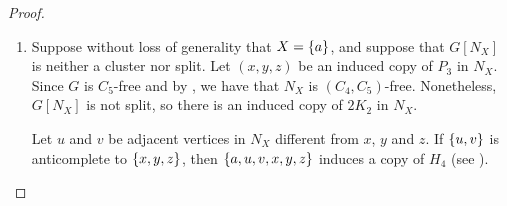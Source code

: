 \begin{proof}
\begin{enumerate}[label=(\roman*)]
\begin{figure}[htb!]
                \caption{An induced copy of $C_5$ or $P_5$ given that $N_X$ and
                    $N_Y$ are nonempty.}
                \label{fig:type_6}
            \end{figure}

        \item Suppose without loss of generality that $X=\left\{a\right\}$, and suppose
            that $G[N_X]$ is neither a cluster nor split. Let $(x,y,z)$ be an
            induced copy of $P_3$ in $N_X$. Since $G$ is $C_5$-free and by
            , we have that $N_X$ is $(C_4,C_5)$-free.
            Nonetheless, $G[N_X]$ is not split, so there is an induced copy of
            $2K_2$ in $N_X$.
            
            Let $u$ and $v$ be adjacent vertices in $N_X$ different from $x$,
            $y$ and $z$. If $\left\{u,v\right\}$ is anticomplete to $\left\{x,y,z\right\}$, then
            $\left\{a,u,v,x,y,z\right\}$ induces a copy of $H_4$ (see ).

            \begin{figure}[htb!]
                \centering
\end{figure}
\end{enumerate}
\end{proof}
